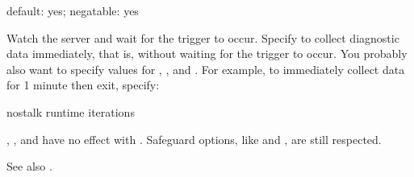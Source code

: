 \documentclass[letterpaper,10pt,english]{sphinxmanual}
\begin{document}
\begin{fulllineitems}
\label{\detokenize{mariadb-stat:cmdoption-mariadb-stat-stalk}}
\sphinxAtStartPar
default: yes; negatable: yes

\sphinxAtStartPar
Watch the server and wait for the trigger to occur.  Specify 
to collect diagnostic data immediately, that is, without waiting for the
trigger to occur.  You probably also want to specify values for
{\hyperref[\detokenize{mariadb-stat:cmdoption-mariadb-stat-interval}]{}}, {\hyperref[\detokenize{mariadb-stat:cmdoption-mariadb-stat-iterations}]{}}, and {\hyperref[\detokenize{mariadb-stat:cmdoption-mariadb-stat-sleep}]{}}.  For example, to
immediately collect data for 1 minute then exit, specify:

\begin{sphinxVerbatim}[commandchars=\\\{\}]
\PYGZhy{}\PYGZhy{}no\PYGZhy{}stalk \PYGZhy{}\PYGZhy{}run\PYGZhy{}time  \PYGZhy{}\PYGZhy{}iterations 
\end{sphinxVerbatim}

\sphinxAtStartPar
{\hyperref[\detokenize{mariadb-stat:cmdoption-mariadb-stat-cycles}]{}}, {\hyperref[\detokenize{mariadb-stat:cmdoption-mariadb-stat-daemonize}]{}}, {\hyperref[\detokenize{mariadb-stat:cmdoption-mariadb-stat-log}]{}} and {\hyperref[\detokenize{mariadb-stat:cmdoption-mariadb-stat-pid}]{}} have no effect
with .  Safeguard options, like {\hyperref[\detokenize{mariadb-stat:cmdoption-mariadb-stat-disk-bytes-free}]{}} and
{\hyperref[\detokenize{mariadb-stat:cmdoption-mariadb-stat-disk-pct-free}]{}}, are still respected.

\sphinxAtStartPar
See also {\hyperref[\detokenize{mariadb-stat:cmdoption-mariadb-stat-collect}]{}}.

\end{fulllineitems}
\end{document}
